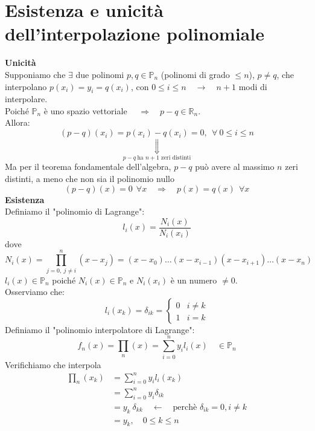 \section{Esistenza e unicità dell'interpolazione polinomiale}
\textbf{Unicità}\\
Supponiamo che $\exists$ due polinomi $p,q \in \mathbb{P}_n$ (polinomi di grado $\le n$), $p\ne q$, che interpolano $p(x_i)=y_i=q(x_i)$, con $0\leq i \leq n \quad \rightarrow \quad n+1$ modi di interpolare.\\
Poiché $\mathbb{P}_n$ è uno spazio vettoriale $\quad \Rightarrow \quad p-q\in\mathbb{R}_n$.\\
Allora:
\[
(p-q)(x_i) = p(x_i) - q(x_i) = 0, \ \ \forall \ 0 \leq i \leq n
\]
\[
\underset{p-q \ \text{ha $n+1$ zeri distinti}}{\Downarrow}
\]
Ma per il teorema fondamentale dell'algebra, $p-q$ può avere al massimo $n$ zeri distinti, a meno che non sia il polinomio nullo
\[
(p-q)(x) = 0 \ \ \forall x \quad \Rightarrow \quad p(x) = q(x) \ \ \forall x
\]
\textbf{Esistenza}\\
Definiamo il "polinomio di Lagrange":
\[
l_i(x) = \frac{N_i(x)}{N_i(x_i)}
\]
dove
\[
N_i(x) = \prod_{j=0, \ j\neq i}^n (x-x_j) = (x-x_0) \dots (x-x_{i-1})(x-x_{i+1}) \dots (x-x_n)
\]
$l_i(x)\in\mathbb{P}_n$ poiché $N_i(x)\in\mathbb{P}_n$ e $N_i(x_i)$ è un numero $\ne0$.\\
Osserviamo che:
\[l_i(x_k) = \delta_{ik} =
\begin{cases}
0 & i\ne k \\
1 & i=k 
\end{cases}\]
Definiamo il "polinomio interpolatore di Lagrange":
\[ f_n(x) = \prod_n(x) = \sum_{i=0}^n y_i l_i(x) \quad \in\mathbb{P}_n\]
Verifichiamo che interpola
\[
\begin{split}
\prod _n (x_k) & = \sum_{i=0}^n y_i l_i (x_k) \\
& = \sum_{i=0}^n y_i \delta_{ik} \\
& = y_k \ \delta_{kk} \quad \longleftarrow \quad \text{perchè } \delta_{ik}=0, i \ne k\\
& = y_k, \quad 0 \leq k \leq n
\end{split}
\]